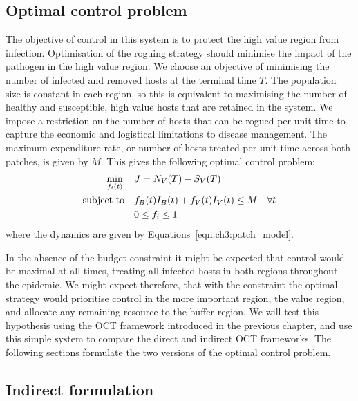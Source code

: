 \subsection{Optimal control problem}

The objective of control in this system is to protect the high value region from infection. Optimisation of the roguing strategy should minimise the impact of the pathogen in the high value region. We choose an objective of minimising the number of infected and removed hosts at the terminal time $T$. The population size is constant in each region, so this is equivalent to maximising the number of healthy and susceptible, high value hosts that are retained in the system. We impose a restriction on the number of hosts that can be rogued per unit time to capture the economic and logistical limitations to disease management. The maximum expenditure rate, or number of hosts treated per unit time across both patches, is given by $M$. This gives the following optimal control problem:
\begin{subequations}\label{eqn:ch3:opt_problem}
    \begin{align}
        \min_{f_i(t)} \quad{} &\null J = N_V(T) - S_V(T) \label{eqn:ch3:opt_problem_a}\\
        \text{subject to} \quad{} &\null f_B(t)I_B(t) + f_V(t)I_V(t) \leq M \quad \forall t \label{eqn:ch3:opt_problem_b}\\
        &\null 0\leq f_i \leq 1\label{eqn:ch3:opt_problem_c}
    \end{align}
\end{subequations}
where the dynamics are given by Equations~\ref{eqn:ch3:patch_model}.

In the absence of the budget constraint it might be expected that control would be maximal at all times, treating all infected hosts in both regions throughout the epidemic. We might expect therefore, that with the constraint the optimal strategy would prioritise control in the more important region, the value region, and allocate any remaining resource to the buffer region. We will test this hypothesis using the OCT framework introduced in the previous chapter, and use this simple system to compare the direct and indirect OCT frameworks. The following sections formulate the two versions of the optimal control problem.

\subsection{Indirect formulation}

